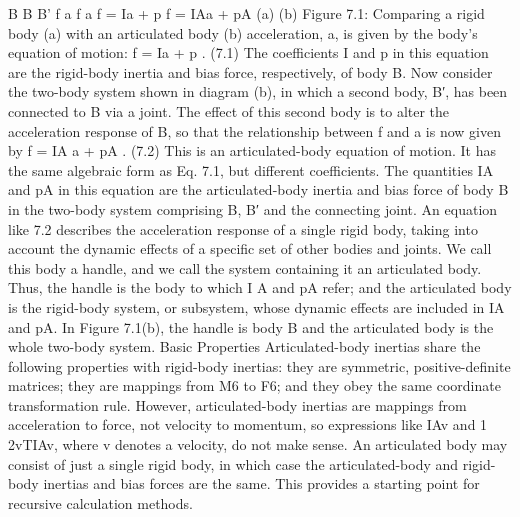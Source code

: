 B B B’ f a f a f = Ia + p f = IAa + pA (a) (b) Figure 7.1: Comparing a rigid body (a) with an articulated body (b) acceleration, a, is given by the body’s equation of motion: f = Ia + p . (7.1) The coefficients I and p in this equation are the rigid-body inertia and bias force, respectively, of body B. Now consider the two-body system shown in diagram (b), in which a second body, B′, has been connected to B via a joint. The effect of this second body is to alter the acceleration response of B, so that the relationship between f and a is now given by f = IA a + pA . (7.2) This is an articulated-body equation of motion. It has the same algebraic form as Eq. 7.1, but different coefficients. The quantities IA and pA in this equation are the articulated-body inertia and bias force of body B in the two-body system comprising B, B′ and the connecting joint. An equation like 7.2 describes the acceleration response of a single rigid body, taking into account the dynamic effects of a specific set of other bodies and joints. We call this body a handle, and we call the system containing it an articulated body. Thus, the handle is the body to which I A and pA refer; and the articulated body is the rigid-body system, or subsystem, whose dynamic effects are included in IA and pA. In Figure 7.1(b), the handle is body B and the articulated body is the whole two-body system. Basic Properties Articulated-body inertias share the following properties with rigid-body inertias: they are symmetric, positive-definite matrices; they are mappings from M6 to F6; and they obey the same coordinate transformation rule. However, articulated-body inertias are mappings from acceleration to force, not velocity to momentum, so expressions like IAv and 1 2vTIAv, where v denotes a velocity, do not make sense. An articulated body may consist of just a single rigid body, in which case the articulated-body and rigid-body inertias and bias forces are the same. This provides a starting point for recursive calculation methods.

